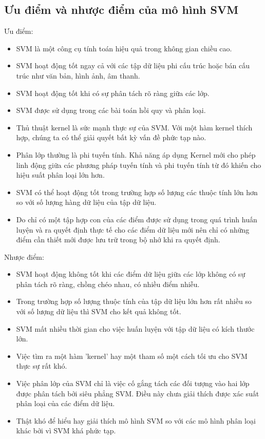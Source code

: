 \documentclass[a4paper, 12pt, oneside]{report}
\begin{document}
\subsection {Ưu điểm và nhược điểm của mô hình SVM }
Ưu điểm:
\begin{itemize}
    \item SVM là một công cụ tính toán hiệu quả trong không gian chiều cao.
    \item SVM hoạt động tốt ngay cả với các tập dữ liệu phi cấu trúc hoặc bán cấu trúc như văn bản, hình ảnh, âm thanh.
    \item SVM hoạt động tốt khi có sự phân tách rõ ràng giữa các lớp.
    \item SVM được sử dụng trong các bài toán hồi quy và phân loại.
    \item Thủ thuật kernel là sức mạnh thực sự của SVM. Với một hàm kernel thích hợp, chúng ta có thể giải quyết bất kỳ vấn đề phức tạp nào.
    \item Phân lớp thường là phi tuyến tính. Khả năng áp dụng Kernel mới cho phép linh động giữa các phương pháp tuyến tính và phi tuyến tính từ đó khiến cho hiệu suất phân loại lớn hơn.
    \item SVM có thể hoạt động tốt trong trường hợp số lượng các thuộc tính lớn hơn so với số lượng hàng dữ liệu của tập dữ liệu.
    \item Do chỉ có một tập hợp con của các điểm được sử dụng trong quá trình huấn luyện và ra quyết định thực tế cho các điểm dữ liệu mới nên chỉ có những điểm cần thiết mới được lưu trữ trong bộ nhớ khi ra quyết định.
\end{itemize}
Nhược điểm:
\begin{itemize}
    \item SVM hoạt động không tốt khi các điểm dữ liệu giữa các lớp không có sự phân tách rõ ràng, chồng chéo nhau, có nhiều điểm nhiễu.
    \item Trong trường hợp số lượng thuộc tính của tập dữ liệu lớn hơn rất nhiều so với số lượng dữ liệu thì SVM cho kết quả không tốt.
    \item SVM mất nhiều thời gian cho việc huấn luyện với tập dữ liệu có kích thước lớn.
    \item Việc tìm ra một hàm 'kernel' hay một tham số một cách tối ưu cho SVM thực sự rất khó.
    \item Việc phân lớp của SVM chỉ là việc cố gắng tách các đối tượng vào hai lớp được phân tách bởi siêu phẳng SVM. Điều này chưa giải thích được xác suất phân loại của các điểm dữ liệu.
    \item Thật khó để hiểu hay giải thích mô hình SVM so với các mô hình phân loại khác bởi vì SVM khá phức tạp.
\end{itemize}
\end{document}
